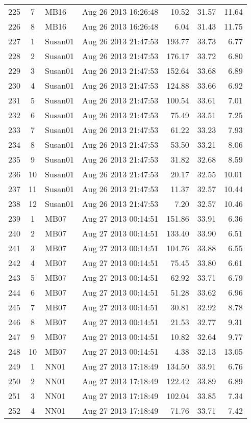 \begin{longtable}{ccllrrr}
225&7&MB16&Aug 26 2013 16:26:48&10.52&31.57&11.64\\
226&8&MB16&Aug 26 2013 16:26:48&6.04&31.43&11.75\\
\hline 
227&1&Susan01&Aug 26 2013 21:47:53&193.77&33.73&6.77\\
228&2&Susan01&Aug 26 2013 21:47:53&176.17&33.72&6.80\\
229&3&Susan01&Aug 26 2013 21:47:53&152.64&33.68&6.89\\
230&4&Susan01&Aug 26 2013 21:47:53&124.88&33.66&6.92\\
231&5&Susan01&Aug 26 2013 21:47:53&100.54&33.61&7.01\\
232&6&Susan01&Aug 26 2013 21:47:53&75.49&33.51&7.25\\
233&7&Susan01&Aug 26 2013 21:47:53&61.22&33.23&7.93\\
234&8&Susan01&Aug 26 2013 21:47:53&53.50&33.21&8.06\\
235&9&Susan01&Aug 26 2013 21:47:53&31.82&32.68&8.59\\
236&10&Susan01&Aug 26 2013 21:47:53&20.17&32.55&10.01\\
237&11&Susan01&Aug 26 2013 21:47:53&11.37&32.57&10.44\\
238&12&Susan01&Aug 26 2013 21:47:53&7.20&32.57&10.46\\
\hline 
239&1&MB07&Aug 27 2013 00:14:51&151.86&33.91&6.36\\
240&2&MB07&Aug 27 2013 00:14:51&133.40&33.90&6.51\\
241&3&MB07&Aug 27 2013 00:14:51&104.76&33.88&6.55\\
242&4&MB07&Aug 27 2013 00:14:51&75.45&33.80&6.61\\
243&5&MB07&Aug 27 2013 00:14:51&62.92&33.71&6.79\\
244&6&MB07&Aug 27 2013 00:14:51&51.28&33.62&6.96\\
245&7&MB07&Aug 27 2013 00:14:51&30.81&32.92&8.78\\
246&8&MB07&Aug 27 2013 00:14:51&21.53&32.77&9.31\\
247&9&MB07&Aug 27 2013 00:14:51&10.82&32.64&9.77\\
248&10&MB07&Aug 27 2013 00:14:51&4.38&32.13&13.05\\
\hline 
249&1&NN01&Aug 27 2013 17:18:49&134.50&33.91&6.76\\
250&2&NN01&Aug 27 2013 17:18:49&122.42&33.89&6.89\\
251&3&NN01&Aug 27 2013 17:18:49&102.04&33.85&7.34\\
252&4&NN01&Aug 27 2013 17:18:49&71.76&33.71&7.42\\

\end{longtable}
